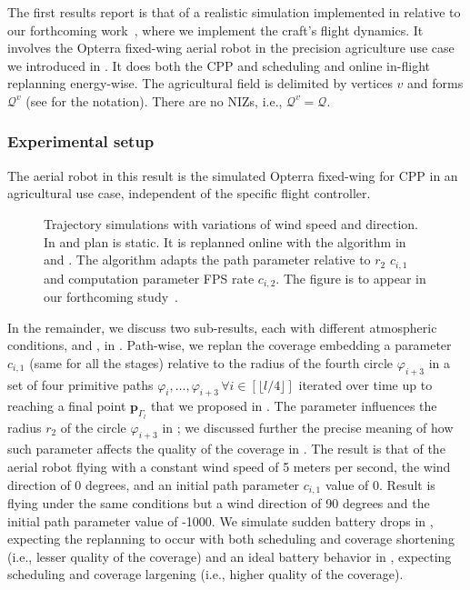 The first results report is that of a realistic simulation implemented in \matlab{} relative to our forthcoming work~\citep{seewald202Xenergy}, where we implement the craft's flight dynamics. It involves the Opterra fixed-wing aerial robot in the precision agriculture use case we introduced in . It does both the CPP and scheduling and online in-flight replanning energy-wise. The agricultural field is delimited by vertices $v$ and forms $\mathcal{Q}^v$ (see  for the notation). There are no NIZs, i.e., $\mathcal{Q}^v=\mathcal{Q}$.

\subsubsection*{Experimental setup}

The aerial robot in this result is the simulated Opterra fixed-wing for CPP in an agricultural use case, independent of the specific flight controller. 
\begin{figure}[t!]
  \centering
  \selectfont
  \footnotesize    
  
  \caption[Numerical simulations of the trajectory with static and dynamic plans]{Trajectory simulations with variations of wind speed and direction. In  and  plan is static. It is replanned online with the algorithm in  and . The algorithm adapts the path parameter relative to $r_2$ $c_{i,1}$ and computation parameter FPS rate $c_{i,2}$. The figure is to appear in our forthcoming study~\citep{seewald202Xenergy}.}
  \label{fig:trajs-revised}
\end{figure}
In the remainder, we discuss two sub-results, each with different atmospheric conditions,  and , in . Path-wise, we replan the coverage embedding a parameter $c_{i,1}$ (same for all the stages) relative to the radius of the fourth circle $\varphi_{i+3}$ in a set of four primitive paths $\varphi_{i},\dots,\varphi_{i+3}\,\forall i\in[\lfloor l/4 \rfloor]$ iterated over time up to reaching a final point $\mathbf{p}_{\Gamma_l}$ that we proposed in . The parameter influences the radius $r_2$ of the circle $\varphi_{i+3}$ in ; we discussed further the precise meaning of how such parameter affects the quality of the coverage in . The result  is that of the aerial robot flying with a constant wind speed of 5 meters per second, the wind direction of 0 degrees, and an initial path parameter $c_{i,1}$ value of 0. Result  is flying under the same conditions but a wind direction of 90 degrees and the initial path parameter value of -1000. We simulate sudden battery drops in , expecting the replanning to occur with both scheduling and coverage shortening (i.e., lesser quality of the coverage) and an ideal battery behavior in , expecting scheduling and coverage largening (i.e., higher quality of the coverage).

